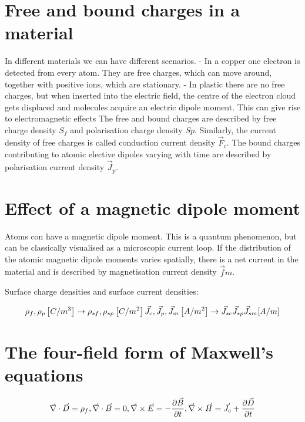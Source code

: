 \documentclass{article}
\begin{document}
\section{Free and bound charges in a material}
In different materials we can have different scenarios.
- In a copper one electron is detected from every atom. They are free charges, which can move around, together with positive ions, which are stationary.
- In plastic there are no free charges, but when inserted into the electric field, the centre of the electron cloud gets displaced and molecules acquire an electric dipole moment. This can give rise to electromagnetic effects
The free and bound charges are described by free charge density $S_f$ and polarisation charge density $S p$.
Similarly, the current density of free charges is called conduction current density $\vec{F}_c$.
The bound charges contributing to atomic elective dipoles varying with time are described by polarisation current density $\vec{J}_p$.

\section{Effect of a magnetic dipole moment}
Atoms con have a magnetic dipole moment. This is a quantum phenomenon, but can be classically visualised as a microscopic current loop. If the distribution of the atomic magnetic dipole moments varies spatially, there is a net current in the material and is described by magnetisation current density $\vec{f} m$.

Surface charge densities and surface current densities:
\begin{center}
$$
\rho_f, \rho_p\left[C / m^3\right] \rightarrow \rho_{s f}, \rho_{s p}\left[C / m^2\right] \\

\vec{J}_c, \vec{J}_p, \vec{J}_m\left[A / m^2\right] \rightarrow \vec{J}_{s c} \vec{J}_{s p} \vec{J}_{s m} {[A / m]} \\
$$
\end{center}

\section{The four-field form of Maxwell's equations}
\begin{center}
$$
\vec{\nabla} \cdot \vec{D}=\rho_f, \\

\vec{\nabla} \cdot \vec{B}=0, \\

\vec{\nabla} \times \vec{E}=-\frac{\partial \vec{B}}{\partial t}, \\

\vec{\nabla} \times \vec{H}=\vec{J}_c+\frac{\partial \vec{D}}{\partial t} \\
$$
\end{center}
\end{document}
